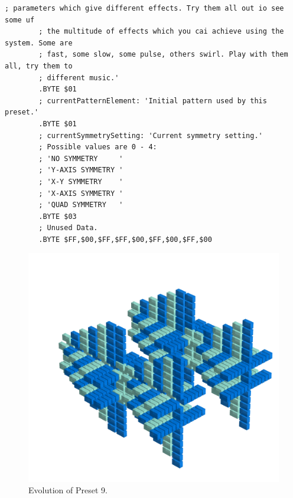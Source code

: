 \begin{lstlisting}[basicstyle=\tiny,caption=Source code for Preset 8.]
        ; parameters which give different effects. Try them all out io see some uf
        ; the multitude of effects which you cai achieve using the system. Some are
        ; fast, some slow, some pulse, others swirl. Play with them all, try them to
        ; different music.'
        .BYTE $01
        ; currentPatternElement: 'Initial pattern used by this preset.'
        .BYTE $01
        ; currentSymmetrySetting: 'Current symmetry setting.'
        ; Possible values are 0 - 4:
        ; 'NO SYMMETRY     '
        ; 'Y-AXIS SYMMETRY '
        ; 'X-Y SYMMETRY    '
        ; 'X-AXIS SYMMETRY '
        ; 'QUAD SYMMETRY   '
        .BYTE $03
        ; Unused Data.
        .BYTE $FF,$00,$FF,$FF,$00,$FF,$00,$FF,$00
\end{lstlisting}


\clearpage                                                                 
\begin{figure}[H]                                                          
    \centering                                                             
    \begin{adjustbox}{width=14cm,center}                                   
      \includegraphics[width=14cm]{src/presets/pattern9-45.png}%
    \end{adjustbox}                                                        
\caption{Evolution of Preset 9.}                                           
\end{figure}                                                               
\clearpage                                                                 
                                                                           
